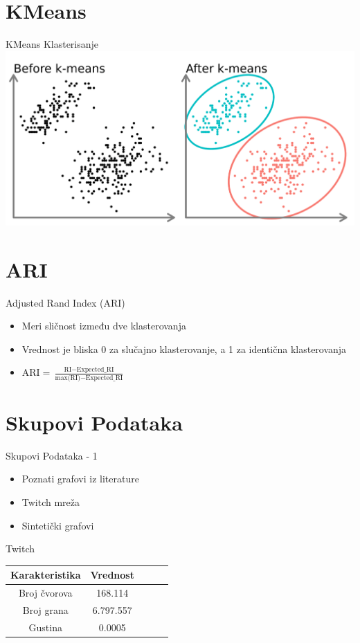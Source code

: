 \documentclass{beamer}
\begin{document}
\section{KMeans}
\begin{frame}{KMeans Klasterisanje}
    \includegraphics[width=\textwidth]{./png/kmeans.png}
\end{frame}

\section{ARI}
\begin{frame}{Adjusted Rand Index (ARI)}
    \begin{itemize}
        \item Meri sličnost između dve klasterovanja
        \item Vrednost je bliska 0 za slučajno klasterovanje, a 1 za identična klasterovanja
        \item $ \text{ARI} = \frac{\text{RI} - \text{Expected\_RI}}{\text{max(RI)} - \text{Expected\_RI}} $
    \end{itemize}
\end{frame}

\section{Skupovi Podataka}
\begin{frame}{Skupovi Podataka - 1}
    \begin{itemize}
        \item Poznati grafovi iz literature 
        \item Twitch mreža
        \item Sintetički grafovi 
    \end{itemize}
\end{frame}

\begin{frame}{Twitch}
    \centering
    \begin{tabular}{|c|c|c|c|c|}
        \hline
        \textbf{Karakteristika} & \textbf{Vrednost} \\
        \hline
        Broj čvorova & 168.114 \\
        Broj grana & 6.797.557 \\
        Gustina & 0.0005 \\
        \hline
    \end{tabular}
\end{frame}
\end{document}
